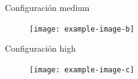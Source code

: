 Configuración medium
\begin{figure}[H]
    \centering
    \texttt{[image: example-image-b]}
\end{figure}

Configuración high
\begin{figure}[H]
    \centering
    \texttt{[image: example-image-c]}
\end{figure}




